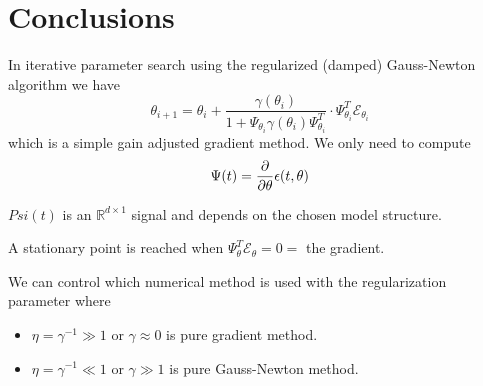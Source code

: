 \section{Conclusions}
In iterative parameter search using the regularized (damped) Gauss-Newton algorithm we have
$$\theta_{i+1} = \theta_i + \frac{\gamma(\theta_i)}{1+\Psi_{\theta_i}\gamma(\theta_i)\Psi_{\theta_i}^T}\cdot \Psi_{\theta_i}^T\mathcal{E}_{\theta_i}$$
which is a simple gain adjusted gradient method. We only need to compute
$$\Psi(t) = \frac{\partial}{\partial\theta}\epsilon(t,\theta)$$

$Psi(t)$ is an $\mathbb{R}^{d\times1}$ signal and depends on the chosen model structure.

A stationary point is reached when $\Psi_\theta^T\mathcal{E}_\theta=0=$ the gradient.

We can control which numerical method is used with the regularization parameter where
\begin{itemize}
\item $\eta = \gamma^{-1} \gg 1$ or $\gamma\approx0$ is pure gradient method.
\item $\eta = \gamma^{-1} \ll 1$ or $\gamma\gg1$ is pure Gauss-Newton method.
\end{itemize}
